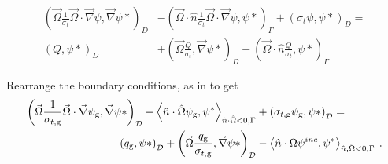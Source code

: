 \begin{align*}
        \left ( \vec{\Omega}\frac{1}{\sigma_t}\vec{\Omega}\cdot \vec{\nabla}\psi, \vec{\nabla}\psi* \right)_D &-     \left ( \vec{\Omega}\cdot \hat{n} \frac{1}{\sigma_t}\vec{\Omega} \cdot \vec{\nabla} \psi,\psi* \right)_{\Gamma} + \left ( \sigma_t \psi, \psi* \right )_D = \\
        \left ( Q, \psi* \right)_D &+ \left ( \vec{\Omega} \frac{Q}{\sigma_t}, \vec{\nabla}\psi* \right)_D - \left ( \vec{\Omega}\cdot \hat{n} \frac{Q}{\sigma_t}, \psi* \right)_{\Gamma} 
\end{align*}

Rearrange the boundary conditions, as in \cite{zheng-thesis} to get
\begin{equation}
    \begin{split}
        \left ( \vec{\Omega}\frac{1}{\sigma_{t, \mathrm{g}}}\vec{\Omega}\cdot \vec{\nabla}\psi_{\mathrm{g}}, \vec{\nabla}\psi* \right)_\mathcal{D} -     \left < \hat{n} \cdot \hat{\Omega}\psi_{\mathrm{g}}, \psi^* \right>_{\hat{n} \cdot \hat{\Omega} < 0, \Gamma} &+ \left ( \sigma_{t, \mathrm{g}} \psi_{\mathrm{g}}, \psi* \right )_\mathcal{D} = \\
        \left ( q_{\mathrm{g}}, \psi* \right)_\mathcal{D} + \left ( \vec{\Omega} \frac{q_{\mathrm{g}}}{\sigma_{t, \mathrm{g}}}, \vec{\nabla}\psi* \right)_\mathcal{D} &- \left < \hat{n} \cdot {\Omega} \psi^{inc}, \psi^* \right>_{\hat{n}, \hat{\Omega} <0, \Gamma} \:.
    \end{split}
\end{equation}